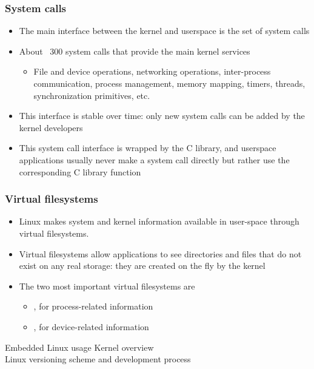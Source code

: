 \begin{frame}
  \frametitle{System calls}
  \begin{itemize}
  \item The main interface between the kernel and userspace is the set
    of system calls
  \item About ~300 system calls that provide the main kernel services
    \begin{itemize}
    \item File and device operations, networking operations,
      inter-process communication, process management, memory mapping,
      timers, threads, synchronization primitives, etc.
    \end{itemize}
  \item This interface is stable over time: only new system calls can
    be added by the kernel developers
  \item This system call interface is wrapped by the C library, and
    userspace applications usually never make a system call directly
    but rather use the corresponding C library function
  \end{itemize}
\end{frame}

\begin{frame}
  \frametitle{Virtual filesystems}
  \begin{itemize}
  \item Linux makes system and kernel information available in
    user-space through virtual filesystems.
  \item Virtual filesystems allow applications to see directories and
    files that do not exist on any real storage: they are created on the
    fly by the kernel
  \item The two most important virtual filesystems are
    \begin{itemize}
    \item {}, for process-related information
    \item {}, for device-related information
    \end{itemize}
  \end{itemize}
\end{frame}

\subchapterframe
{Embedded Linux usage}
{Kernel overview\\
\normalsize Linux versioning scheme and development process}

